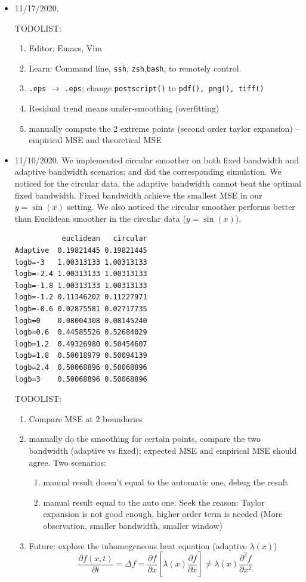 \documentclass{article}
\begin{document}
\begin{itemize}
\item 11/17/2020. 

TODOLIST:
\begin{enumerate}
\item Editor: Emacs, Vim
\item Learn: Command line, \texttt{ssh}, \texttt{zsh},\texttt{bash}, to remotely control.
\item \texttt{.eps} $\rightarrow$ \texttt{.eps}; change \texttt{postscript()} to \texttt{pdf(), png(), tiff()}
\item Residual trend means under-smoothing (overfitting)
\item manually compute the 2 extreme points (second order taylor expansion) -- empirical MSE and theoretical MSE
\end{enumerate}

\item 11/10/2020. We implemented circular smoother on both fixed bandwidth and adaptive bandwidth scenarios; and did the corresponding simulation. We noticed for the circular data, the adaptive bandwidth cannot beat the optimal fixed bandwidth. Fixed bandwidth achieve the smallest MSE in our $y=\sin(x)$ setting. We also noticed the circular smoother performs better than Euclidean smoother in the circular data ($y=\sin(x)$). 

\begin{verbatim}
           euclidean   circular
Adaptive  0.19821445 0.19821445
logb=-3   1.00313133 1.00313133
logb=-2.4 1.00313133 1.00313133
logb=-1.8 1.00313133 1.00313133
logb=-1.2 0.11346202 0.11227971
logb=-0.6 0.02875581 0.02717735
logb=0    0.08004308 0.08145240
logb=0.6  0.44585526 0.52684029
logb=1.2  0.49326980 0.50454607
logb=1.8  0.50018979 0.50094139
logb=2.4  0.50068896 0.50068896
logb=3    0.50068896 0.50068896
\end{verbatim}


TODOLIST:
  \begin{enumerate}
    \item Compare MSE at 2 boundaries 
    \item manually do the smoothing for certain points, compare the two bandwidth (adaptive vs fixed); expected MSE and empirical MSE should agree. Two scenarios:
    \begin{enumerate}
    \item manual result doesn't equal to the automatic one, debug the result
    \item manual result equal to the auto one. Seek the reason: Taylor expansion is not good enough, higher order term is needed (More observation, smaller bandwidth, smaller window)
    \end{enumerate}
    \item Future: explore the inhomogeneous heat equation (adaptive $\lambda(x)$) 
    $$\frac{\partial f(x,t)}{\partial t}  = \Delta f = \frac{\partial f}{\partial x}[\lambda(x)\frac{\partial f}{\partial x}] \neq  \lambda(x)\frac{\partial^2 f}{
    \partial x^2} $$


\end{enumerate}
\end{itemize}
\end{document}
